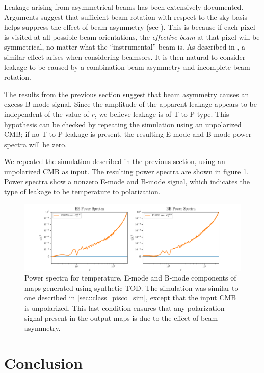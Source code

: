 \documentclass[a4paper,fleqn]{cas-dc}\sloppy
\begin{document}
	Leakage arising from asymmetrical beams has been extensively documented. Arguments suggest that sufficient beam rotation with respect to the sky basis helps suppress the effect of beam asymmetry (see \cite{2003ApJS..148...39P}). This is because if each pixel is visited at all possible beam orientations, the \textsl{effective beam} at that pixel will be symmetrical, no matter what the ``instrumental'' beam is. As described in \cite{2007MNRAS.376.1767O}, a similar effect arises when considering beamsors. It is then natural to consider leakage to be caused by a combination beam asymmetry and incomplete beam rotation.
	
	The results from the previous section suggest that beam asymmetry causes an excess B-mode signal. Since the amplitude of the apparent leakage appears to be independent of the value of $r$, we believe leakage is of T to P type. This hypothesis can be checked by repeating the simulation using an unpolarized CMB; if no T to P leakage is present, the resulting E-mode and B-mode power spectra will be zero.
	
	We repeated the simulation described in the previous section, using an unpolarized CMB as input. The resulting power spectra are shown in figure  \ref{fig::classscan720circulargaussianbeamsr0d00extratonly}. Power spectra show a nonzero E-mode and B-mode signal, which indicates the type of leakage to be temperature to polarization.
	
	\begin{figure}
		\centering
		\includegraphics[width=1.0\linewidth]{figures/T_to_P_leakage_for_class.pdf}
		\caption{Power spectra for temperature, E-mode and B-mode components of maps generated using synthetic TOD. The simulation was similar to one described in \ref{sec::class_pisco_sim}, except that the input CMB is unpolarized. This last condition ensures that any polarization signal present in the output maps is due to the effect of beam asymmetry.}
		\label{fig::classscan720circulargaussianbeamsr0d00extratonly}
	\end{figure}
	
	
	\section{Conclusion}
	\label{sec::conclusions}
	
\end{document}
